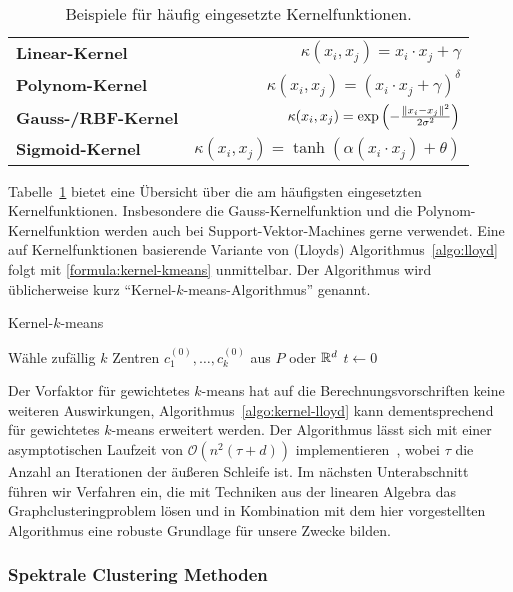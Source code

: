 \begin{table}[t]
\centering
\begin{tabular}{@{}lr@{}} \toprule
	\textbf{Linear-Kernel} & $\kappa(x_i, x_j) = x_i \cdot x_j + \gamma $ \\
	\textbf{Polynom-Kernel} & $\kappa(x_i, x_j) = \left( x_i \cdot x_j + \gamma \right)^\delta$ \\
	\textbf{Gauss-/RBF-Kernel} & $\kappa(x_i, x_j) = \exp \left( - \frac{\lVert {x_i} - {x_j} \rVert^2}{2 \sigma^2} \right)$ \\
	\textbf{Sigmoid-Kernel} & $\kappa(x_i, x_j) = \tanh(\alpha(x_i \cdot x_j) + \theta) $ \\ \bottomrule
\end{tabular}
\caption{Beispiele für häufig eingesetzte Kernelfunktionen.}
\label{tbl:kernel-functions}
\end{table}
Tabelle~\ref{tbl:kernel-functions} bietet eine Übersicht über die am häufigsten eingesetzten Kernelfunktionen. Insbesondere
die Gauss-Kernelfunktion und die Polynom-Kernelfunktion werden auch bei Support-Vektor-Machines gerne verwendet.
\absatz
Eine auf Kernelfunktionen basierende Variante von (Lloyds) Algorithmus~\ref{algo:lloyd} folgt mit \ref{formula:kernel-kmeans}
unmittelbar. Der Algorithmus wird üblicherweise kurz "`Kernel-$k$-means-Algorithmus"' genannt.

\begin{algorithm}[H]
\label{algo:kernel-lloyd}
\caption{Kernel-$k$-means}
	\DontPrintSemicolon
	
	\BlankLine
	
	Wähle zufällig $k$ Zentren $c_1^{(0)}, \dots, c_k^{(0)}$ aus $P$ oder $\mathbb{R}^{d}$\;
	$t \leftarrow 0$\;
\end{algorithm}
Der Vorfaktor für gewichtetes $k$-means hat auf die Berechnungsvorschriften keine weiteren Auswirkungen,
Algorithmus~\ref{algo:kernel-lloyd} kann dementsprechend für gewichtetes $k$-means erweitert werden. Der Algorithmus
lässt sich mit einer asymptotischen Laufzeit von $\mathcal{O}(n^2 (\tau + d))$ implementieren~\cite{DhillonGK04}, wobei
$\tau$ die Anzahl an Iterationen der äußeren Schleife ist.
\absatz
Im nächsten Unterabschnitt führen wir Verfahren ein, die mit Techniken aus der linearen Algebra das Graphclusteringproblem
lösen und in Kombination mit dem hier vorgestellten Algorithmus eine robuste Grundlage für unsere Zwecke bilden.

\subsubsection{Spektrale Clustering Methoden}